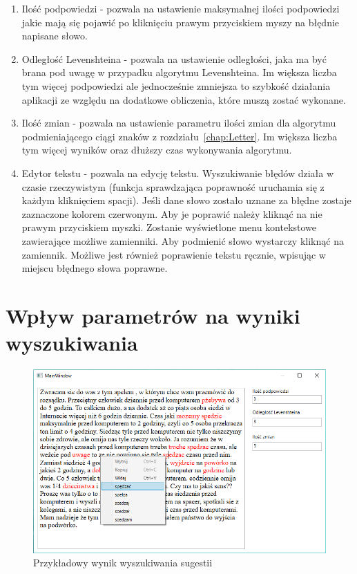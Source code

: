 \begin{enumerate}
	\item Ilość podpowiedzi - pozwala na ustawienie maksymalnej ilości podpowiedzi jakie mają się pojawić po kliknięciu prawym przyciskiem myszy na błędnie napisane słowo.
	\item Odległość Levenshteina - pozwala na ustawienie odległości, jaka ma być brana pod uwagę w przypadku algorytmu Levenshteina. Im większa liczba tym więcej podpowiedzi ale jednocześnie zmniejsza to szybkość działania aplikacji ze względu na dodatkowe obliczenia, które muszą zostać wykonane. 
	\item Ilość zmian - pozwala na ustawienie parametru ilości zmian dla algorytmu podmieniającego ciągi znaków z rozdziału~\ref{chap:Letter}. Im większa liczba tym więcej wyników oraz dłuższy czas wykonywania algorytmu.
	\item Edytor tekstu - pozwala na edycję tekstu. Wyszukiwanie błędów działa w czasie rzeczywistym (funkcja sprawdzająca poprawność uruchamia się z każdym kliknięciem spacji). Jeśli dane słowo zostało uznane za błędne zostaje zaznaczone kolorem czerwonym. Aby je poprawić należy kliknąć na nie prawym przyciskiem myszki. Zostanie wyświetlone menu kontekstowe zawierające możliwe zamienniki. Aby podmienić słowo wystarczy kliknąć na zamiennik. Możliwe jest również poprawienie tekstu ręcznie, wpisując w miejscu błędnego słowa poprawne. 
	
\end{enumerate}

\section{Wpływ parametrów na wyniki wyszukiwania}

\begin{figure} [H]
	\centering
	\includegraphics[width=1\linewidth]{rozdzial03/screen2.png}
	\caption{Przykładowy wynik wyszukiwania sugestii}
	\label{fig:interfejs1}
\end{figure}

